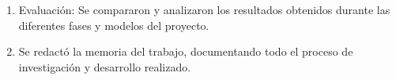 \begin{enumerate}
\item Evaluación: Se compararon y analizaron los resultados obtenidos durante las diferentes fases y modelos del proyecto.
\item Se redactó la memoria del trabajo, documentando todo el proceso de investigación y desarrollo realizado.
\end{enumerate}


